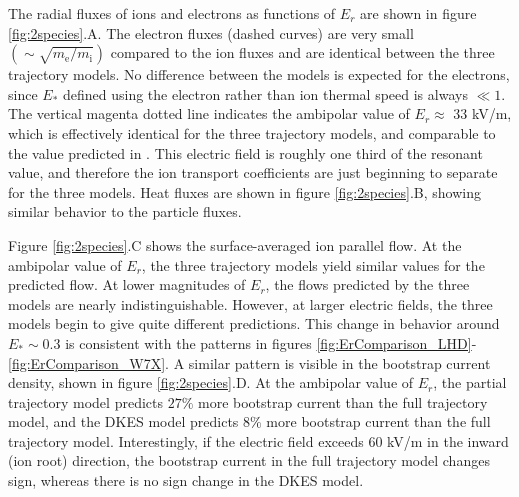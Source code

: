 \documentclass[12pt,superscriptaddress]{revtex4}
\newcommand{\me}{m_{\mathrm{e}}}
\newcommand{\mi}{m_{\mathrm{i}}}
\begin{document}
The radial fluxes of ions and electrons as functions of $E_r$ are shown in figure \ref{fig:2species}.A.
The electron fluxes (dashed curves) are very small $(\sim \sqrt{\me/\mi})$ compared to the ion fluxes
and are identical between the three trajectory models. No difference between the models is expected for
the electrons, since $E_*$ defined using the electron rather than ion thermal speed is always $\ll 1$.
The vertical magenta dotted line indicates the ambipolar value of $E_r \approx $ 33 kV/m, which is effectively
identical for the three trajectory models, and comparable to the value predicted in \cite{Turkin}.
This electric field is roughly one third of the resonant value, and therefore the ion transport coefficients are
just beginning to separate for the three models. Heat fluxes are shown in figure \ref{fig:2species}.B, showing similar
behavior to the particle fluxes.

Figure \ref{fig:2species}.C shows the surface-averaged ion parallel flow. At the ambipolar value of $E_r$,
the three trajectory models yield similar values for the predicted flow.
At lower magnitudes of $E_r$, the flows predicted by the three models are nearly indistinguishable.
However, at larger electric fields, the three models begin to give quite different predictions.
This change in behavior around $E_* \sim 0.3$ is consistent with the patterns in figures \ref{fig:ErComparison_LHD}- \ref{fig:ErComparison_W7X}.
A similar pattern is visible in the bootstrap current density, shown in figure \ref{fig:2species}.D.
At the ambipolar value of $E_r$, the partial trajectory model predicts
$27\%$ more bootstrap current than the full trajectory model,
and the DKES model predicts $8\%$ more bootstrap current than the full trajectory model.
Interestingly, if the electric field exceeds 60 kV/m in the inward (ion root) direction, the bootstrap current
in the full trajectory model changes sign, whereas there is no sign change in the DKES model.
\end{document}
